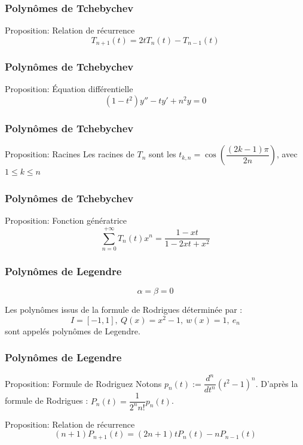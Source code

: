 \documentclass[xcolor=dvipsnames,10pt,mathserif]{beamer}
\theoremstyle{plain}
\begin{document}
\begin{frame}\frametitle{Polynômes de Tchebychev \hfill \insertpagenumber}
\begin{block}{Proposition: Relation de récurrence}
\begin{equation}
T_{n+1}(t)=2tT_{n}(t)-T_{n-1}(t)
\end{equation}
\end{block}
\end{frame}


\begin{frame}\frametitle{Polynômes de Tchebychev \hfill \insertpagenumber}
\begin{block}{Proposition: Équation différentielle}
\begin{equation}
(1-t^{2})y''-ty'+n^{2}y=0
\end{equation}
\end{block}
\end{frame}


\begin{frame}\frametitle{Polynômes de Tchebychev \hfill \insertpagenumber}
\begin{block}{Proposition: Racines}
Les racines de $T_n$ sont les $t_{k,n}=\cos \left(\dfrac{(2k-1)\pi}{2n}\right)$, avec $1\leqslant k \leqslant n$
\end{block}
\end{frame}


\begin{frame}\frametitle{Polynômes de Tchebychev \hfill \insertpagenumber}
\begin{block}{Proposition: Fonction génératrice}
\begin{equation}
\sum\limits_{n=0}^{+\infty}T_n(t)x^n = \dfrac{1-xt}{1-2xt+x^2}
\end{equation}
\end{block}
\end{frame}


\begin{frame}\frametitle{Polynômes de Legendre \hfill \insertpagenumber}
$$\alpha=\beta=0$$
\begin{block}{}
Les polynômes issus de la formule de Rodrigues déterminée par : 
\begin{equation}
I=[-1,1],\ Q(x)=x^{2}-1,\ w(x)=1,\ e_{n}
\end{equation}
sont appelés polynômes de Legendre.
\end{block}
\end{frame}


\begin{frame}\frametitle{Polynômes de Legendre \hfill \insertpagenumber}
\begin{block}{Proposition: Formule de Rodriguez}
Notons $p_{n}(t):=\dfrac{d^{n}}{dt^{n}}(t^{2}-1)^{n}$. D'après la formule de Rodrigues : $P_{n}(t)=\dfrac{1}{2^{n}n!}p_{n}(t)$.
\end{block}
\pause
\begin{block}{Proposition: Relation de récurrence}
\begin{equation}
(n+1)P_{n+1}(t)=(2n+1)tP_{n}(t)-nP_{n-1}(t)
\end{equation}
\end{block}
\end{frame}
\end{document}

